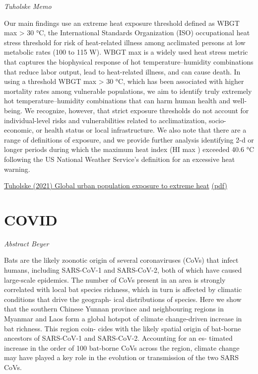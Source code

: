 \documentclass[
]{book}
\begin{document}
\emph{Tuholske Memo}

Our main findings use an extreme heat exposure threshold defined as
WBGT max \textgreater{} 30 °C, the
International Standards Organization (ISO) occupational heat
stress threshold for risk of heat-related illness among acclimated
persons at low metabolic rates (100 to 115 W). WBGT max is a
widely used heat stress metric that captures the biophysical
response of hot temperature--humidity combinations
that reduce labor output, lead to heat-related illness, and
can cause death. In using a threshold WBGT max \textgreater{} 30 °C,
which has been associated with higher mortality rates among
vulnerable populations, we aim to identify truly extremely hot
temperature--humidity combinations that can harm human
health and well-being.
We recognize, however, that strict exposure
thresholds do not account for individual-level risks and
vulnerabilities related to acclimatization, socio-economic, or health status
or local infrastructure. We also note that there are a
range of definitions of exposure, and we provide further analysis
identifying 2-d or longer periods during which the maximum heat
index (HI max ) exceeded 40.6 °C
following the US National Weather Service's definition for an
excessive heat warning.

\href{https://doi.org/10.1073/pnas.2024792118}{Tuholske (2021) Global urban population exposure to extreme heat}
\href{pdf/Tuholske_2021_Urban_Extreme_Heat.pdf}{(pdf)}

\hypertarget{covid}{%
\section{COVID}\label{covid}}

\emph{Abstract Beyer}

Bats are the likely zoonotic origin of several coronaviruses (CoVs) that infect humans, including SARS-CoV-1 and
SARS-CoV-2, both of which have caused large-scale epidemics. The number of CoVs present in an area is strongly
correlated with local bat species richness, which in turn is affected by climatic conditions that drive the geograph-
ical distributions of species. Here we show that the southern Chinese Yunnan province and neighbouring regions
in Myanmar and Laos form a global hotspot of climate change-driven increase in bat richness. This region coin-
cides with the likely spatial origin of bat-borne ancestors of SARS-CoV-1 and SARS-CoV-2. Accounting for an es-
timated increase in the order of 100 bat-borne CoVs across the region, climate change may have played a key role
in the evolution or transmission of the two SARS CoVs.
\end{document}
